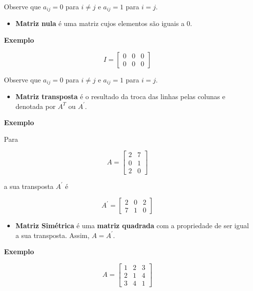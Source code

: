 \documentclass[
]{book}
\providecommand{\tightlist}{%
  \setlength{\itemsep}{0pt}\setlength{\parskip}{0pt}}
\begin{document}
Observe que \(a_{ij} =0\) para \(i \neq j\) e \(a_{ij} = 1\) para \(i = j\).

\begin{itemize}
\tightlist
\item
  \textbf{Matriz nula} é uma matriz cujos elementos são iguais a 0.
\end{itemize}

\textbf{Exemplo}

\begin{equation*}
I = 
\begin{bmatrix}
0 & 0 & 0\\
0 & 0 & 0
\end{bmatrix}
\end{equation*}

Observe que \(a_{ij} =0\) para \(i \neq j\) e \(a_{ij} = 1\) para \(i = j\).

\begin{itemize}
\tightlist
\item
  \textbf{Matriz transposta} é o resultado da troca das linhas pelas colunas e denotada por \(A^T\) ou \(A^\prime\).
\end{itemize}

\textbf{Exemplo}

Para

\begin{equation*}
A = 
\begin{bmatrix}
2 & 7 \\
0 & 1 \\
2 & 0 
\end{bmatrix}
\end{equation*}

a sua transposta \(A^\prime\) é

\begin{equation*}
A^\prime = 
\begin{bmatrix}
2 & 0 & 2\\
7 & 1 & 0
\end{bmatrix}
\end{equation*}

\begin{itemize}
\tightlist
\item
  \textbf{Matriz Simétrica} é uma \textbf{matriz quadrada} com a propriedade de ser igual a sua transposta. Assim, \(A = A^\prime\).
\end{itemize}

\textbf{Exemplo}

\begin{equation*}
A = 
\begin{bmatrix}
1 & 2 & 3\\
2 & 1 & 4\\
3 & 4 & 1
\end{bmatrix}
\end{equation*}
\end{document}
